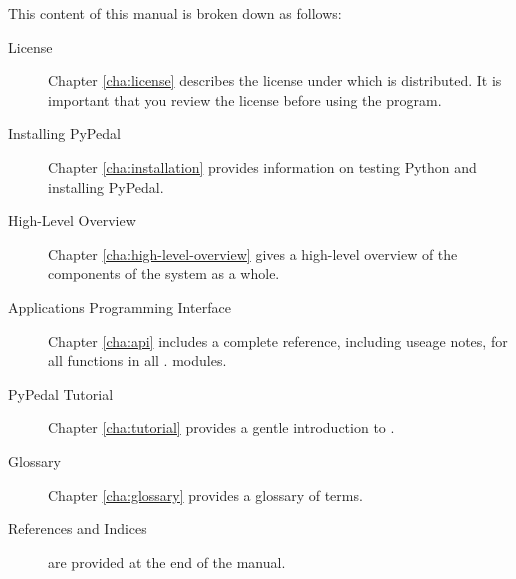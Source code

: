 This content of this manual is broken down as follows:
\begin{description}
\item[License] Chapter \ref{cha:license} describes the license under which \PyPedal{} is distributed.  It is important that you review the license before using the program.
\item[Installing PyPedal] Chapter \ref{cha:installation} provides information
   on testing Python and installing PyPedal.
\item[High-Level Overview] Chapter \ref{cha:high-level-overview} gives a
   high-level overview of the components of the \PyPedal{} system as a whole.
\item[Applications Programming Interface] Chapter \ref{cha:api} includes a complete reference, including useage notes, for all functions in all \PyPedal{}. modules.
\item[PyPedal Tutorial] Chapter \ref{cha:tutorial} provides a gentle introduction to \PyPedal{}.
\item[Glossary] Chapter \ref{cha:glossary} provides a glossary of terms.
\item[References and Indices] are provided at the end of the manual.
\end{description}

